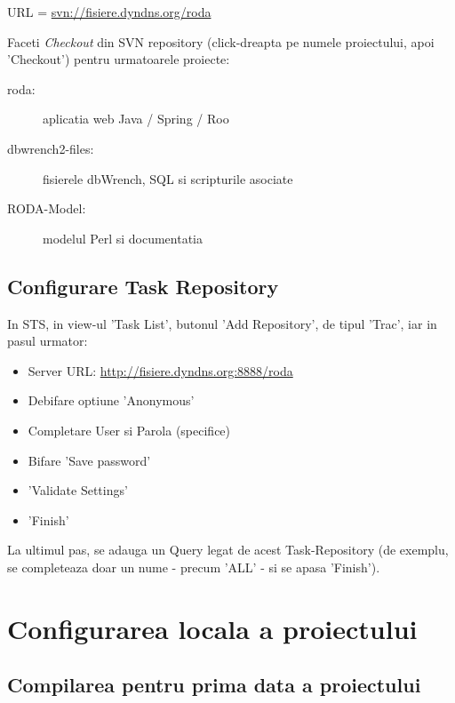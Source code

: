 URL = \url{svn://fisiere.dyndns.org/roda}

Faceti \emph{Checkout} din SVN repository (click-dreapta pe numele
proiectului, apoi 'Checkout') pentru urmatoarele proiecte:
\begin{description}
\item [roda:] aplicatia web Java / Spring / Roo
\item [dbwrench2-files:] fisierele dbWrench, SQL si scripturile asociate
\item [RODA-Model:] modelul Perl si documentatia
\end{description}


\subsection{Configurare Task Repository}
In STS, in view-ul 'Task List', butonul 'Add Repository', de tipul 'Trac', 
iar in pasul urmator:
\begin{itemize}
\item 
Server URL:    \url{http://fisiere.dyndns.org:8888/roda}
\item
Debifare optiune 'Anonymous'
\item
Completare User si Parola (specifice)
\item
Bifare 'Save password'
\item
'Validate Settings'
\item
'Finish'
\end{itemize}

La ultimul pas, se adauga un Query legat de acest Task-Repository (de exemplu,
se completeaza doar un nume - precum 'ALL' - si se apasa 'Finish').

\section{Configurarea locala a proiectului}

\subsection{Compilarea pentru prima data a proiectului}

